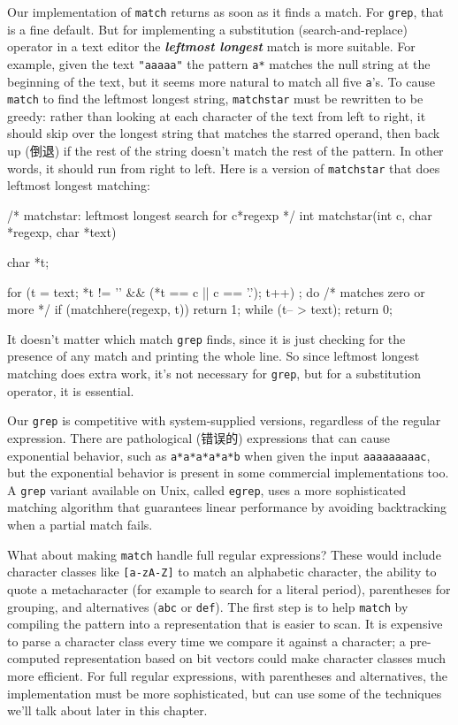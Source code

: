 Our implementation of \verb'match' returns as soon as it finds a match. For
\verb'grep', that is a fine default. But for implementing a substitution
(search-and-replace) operator in a text editor the \textit{\textbf{leftmost
longest}} match is more suitable. For example, given the text
\verb'"aaaaa"' the pattern \verb'a*' matches the null string at the
beginning of the text, but it seems more natural to match all five
\verb'a''s. To cause \verb'match' to find the leftmost longest string,
\verb'matchstar' must be rewritten to be greedy: rather than looking at
each character of the text from left to right, it should skip over the
longest string that matches the starred operand, then back up (倒退) if the
rest of the string doesn't match the rest of the pattern. In other words,
it should run from right to left. Here is a version of \verb'matchstar'
that does leftmost longest matching:
\begin{wellcode}
    /* matchstar: leftmost longest search for c*regexp */
    int matchstar(int c, char *regexp, char *text)
    {
        char    *t;

        for (t = text; *t != '\0' && (*t == c || c == '.');
                t++)
            ;
        do {    /* matches zero or more */
            if (matchhere(regexp, t))
                return 1;
        } while (t-- > text);
        return 0;
    }
\end{wellcode}
It doesn't matter which match \verb'grep' finds, since it is just checking
for the presence of any match and printing the whole line. So since
leftmost longest matching does extra work, it's not necessary for
\verb'grep', but for a substitution operator, it is essential.

Our \verb'grep' is competitive with system-supplied versions, regardless of
the regular expression. There are pathological (错误的) expressions that
can cause exponential behavior, such as \verb'a*a*a*a*a*b' when given the
input \verb'aaaaaaaaac', but the exponential behavior is present in some
commercial implementations too. A \verb'grep' variant available on Unix,
called \verb'egrep', uses a more sophisticated matching algorithm that
guarantees linear performance by avoiding backtracking when a partial match
fails.

What about making \verb'match' handle full regular expressions? These would
include character classes like \verb'[a-zA-Z]' to match an alphabetic
character, the ability to quote a metacharacter (for example to search for
a literal period), parentheses for grouping, and alternatives (\verb'abc'
or \verb'def'). The first step is to help \verb'match' by compiling the
pattern into a representation that is easier to scan. It is expensive to
parse a character class every time we compare it against a character; a
pre-computed representation based on bit vectors could make character
classes much more efficient. For full regular expressions, with parentheses
and alternatives, the implementation must be more sophisticated, but can
use some of the techniques we'll talk about later in this chapter.

